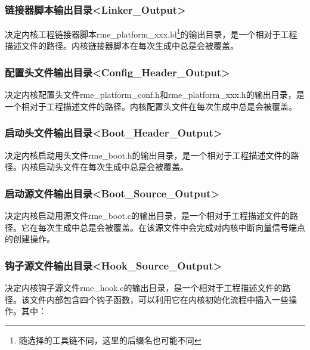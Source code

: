 \subsubsection{链接器脚本输出目录<Linker\_Output>{}}\label{subsubsec:5-3-12-15}

决定内核工程链接器脚本rme\_platform\_xxx.ld\footnote{随选择的工具链不同，这里的后缀名也可能不同}的输出目录，是一个相对于工程描述文件的路径。内核链接器脚本在每次生成中总是会被覆盖。

\subsubsection{配置头文件输出目录<Config\_Header\_Output>{}}\label{subsubsec:5-3-12-16}

决定内核配置头文件rme\_platform\_conf.h和rme\_platform\_xxx.h的输出目录，是一个相对于工程描述文件的路径。内核配置头文件在每次生成中总是会被覆盖。

\subsubsection{启动头文件输出目录<Boot\_Header\_Output>{}}\label{subsubsec:5-3-12-17}

决定内核启动用头文件rme\_boot.h的输出目录，是一个相对于工程描述文件的路径。内核启动头文件在每次生成中总是会被覆盖。

\subsubsection{启动源文件输出目录<Boot\_Source\_Output>{}}\label{subsubsec:5-3-12-18}

决定内核启动用源文件rme\_boot.c的输出目录，是一个相对于工程描述文件的路径。它在每次生成中总是会被覆盖。在该源文件中会完成对内核中断向量信号端点的创建操作。

\subsubsection{钩子源文件输出目录<Hook\_Source\_Output>{}}\label{subsubsec:5-3-12-19}

决定内核钩子源文件rme\_hook.c的输出目录，是一个相对于工程描述文件的路径。该文件内部包含四个钩子函数，可以利用它在内核初始化流程中插入一些操作。其中：

